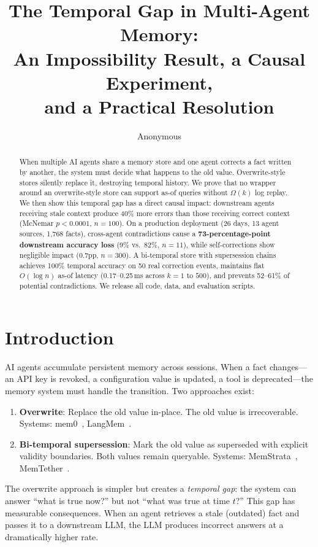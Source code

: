 \documentclass{article}
\title{The Temporal Gap in Multi-Agent Memory:\\An Impossibility Result, a Causal Experiment,\\and a Practical Resolution}
\author{Anonymous}
\date{}
\begin{document}
\maketitle

\begin{abstract}
When multiple AI agents share a memory store and one agent corrects a fact written by another, the system must decide what happens to the old value. Overwrite-style stores silently replace it, destroying temporal history. We prove that no wrapper around an overwrite-style store can support as-of queries without $\Omega(k)$ log replay. We then show this temporal gap has a direct causal impact: downstream agents receiving stale context produce 40\% more errors than those receiving correct context (McNemar $p < 0.0001$, $n{=}100$). On a production deployment (26 days, 13 agent sources, 1{,}768 facts), cross-agent contradictions cause a \textbf{73-percentage-point downstream accuracy loss} (9\% vs.\ 82\%, $n{=}11$), while self-corrections show negligible impact (0.7pp, $n{=}300$). A bi-temporal store with supersession chains achieves 100\% temporal accuracy on 50 real correction events, maintains flat $O(\log n)$ as-of latency (0.17--0.25\,ms across $k{=}1$ to $500$), and prevents 52--61\% of potential contradictions. We release all code, data, and evaluation scripts.
\end{abstract}

\section{Introduction}
\label{sec:intro}

AI agents accumulate persistent memory across sessions. When a fact changes---an API key is revoked, a configuration value is updated, a tool is deprecated---the memory system must handle the transition. Two approaches exist:

\begin{enumerate}
\item \textbf{Overwrite}: Replace the old value in-place. The old value is irrecoverable. Systems: mem0~\cite{mem0}, LangMem~\cite{langmem}.
\item \textbf{Bi-temporal supersession}: Mark the old value as superseded with explicit validity boundaries. Both values remain queryable. Systems: MemStrata~\cite{memstrata}, MemTether~\cite{memtether}.
\end{enumerate}

The overwrite approach is simpler but creates a \emph{temporal gap}: the system can answer ``what is true now?'' but not ``what was true at time $t$?'' This gap has measurable consequences. When an agent retrieves a stale (outdated) fact and passes it to a downstream LLM, the LLM produces incorrect answers at a dramatically higher rate.
\end{document}
